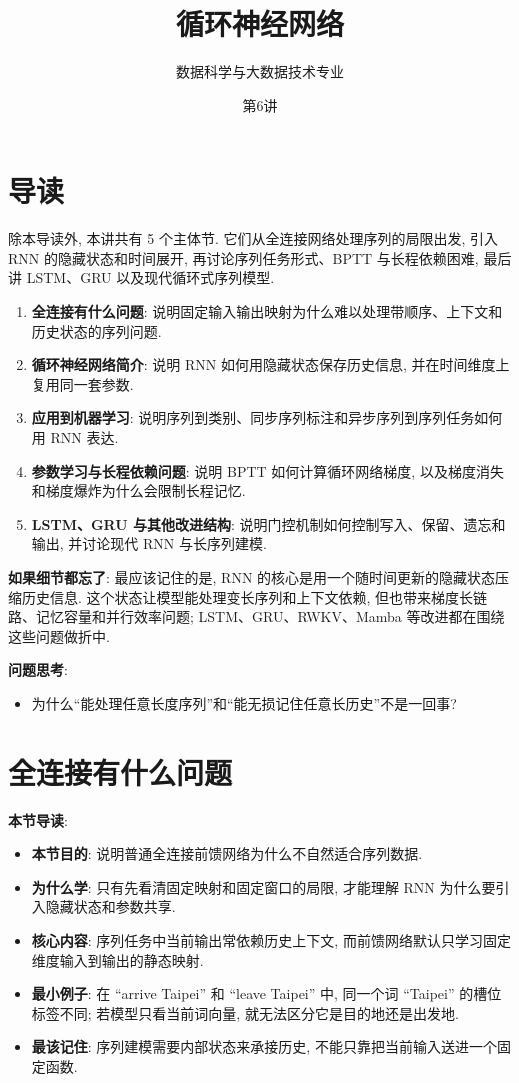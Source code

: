 \documentclass{../nndlcourse}
\begin{document}
\title{循环神经网络 }
\author{数据科学与大数据技术专业}
\date{第6讲 }
\maketitle

\section{导读}

除本导读外, 本讲共有 5 个主体节. 它们从全连接网络处理序列的局限出发, 引入 RNN 的隐藏状态和时间展开, 再讨论序列任务形式、BPTT 与长程依赖困难, 最后讲 LSTM、GRU 以及现代循环式序列模型.

\begin{enumerate}
  \item \textbf{全连接有什么问题}: 说明固定输入输出映射为什么难以处理带顺序、上下文和历史状态的序列问题.
  \item \textbf{循环神经网络简介}: 说明 RNN 如何用隐藏状态保存历史信息, 并在时间维度上复用同一套参数.
  \item \textbf{应用到机器学习}: 说明序列到类别、同步序列标注和异步序列到序列任务如何用 RNN 表达.
  \item \textbf{参数学习与长程依赖问题}: 说明 BPTT 如何计算循环网络梯度, 以及梯度消失和梯度爆炸为什么会限制长程记忆.
  \item \textbf{LSTM、GRU 与其他改进结构}: 说明门控机制如何控制写入、保留、遗忘和输出, 并讨论现代 RNN 与长序列建模.
\end{enumerate}

\textbf{如果细节都忘了}: 最应该记住的是, RNN 的核心是用一个随时间更新的隐藏状态压缩历史信息. 这个状态让模型能处理变长序列和上下文依赖, 但也带来梯度长链路、记忆容量和并行效率问题; LSTM、GRU、RWKV、Mamba 等改进都在围绕这些问题做折中.

\textbf{问题思考}:
\begin{itemize}
  \item 为什么“能处理任意长度序列”和“能无损记住任意长历史”不是一回事?
\end{itemize}

\section{全连接有什么问题}

\textbf{本节导读}:
\begin{itemize}
  \item \textbf{本节目的}: 说明普通全连接前馈网络为什么不自然适合序列数据.
  \item \textbf{为什么学}: 只有先看清固定映射和固定窗口的局限, 才能理解 RNN 为什么要引入隐藏状态和参数共享.
  \item \textbf{核心内容}: 序列任务中当前输出常依赖历史上下文, 而前馈网络默认只学习固定维度输入到输出的静态映射.
  \item \textbf{最小例子}: 在 ``arrive Taipei'' 和 ``leave Taipei'' 中, 同一个词 ``Taipei'' 的槽位标签不同; 若模型只看当前词向量, 就无法区分它是目的地还是出发地.
  \item \textbf{最该记住}: 序列建模需要内部状态来承接历史, 不能只靠把当前输入送进一个固定函数.
\end{itemize}
\end{document}
